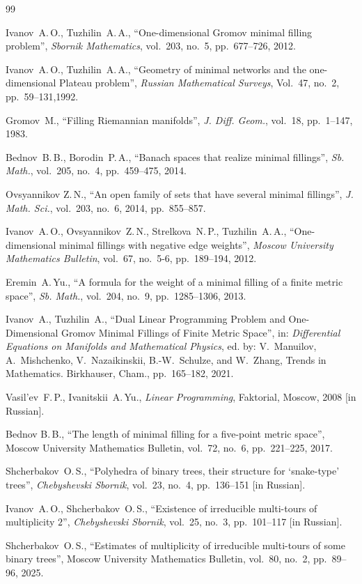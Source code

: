 \documentclass[10pt]{article}
\theoremstyle{plain}
\theoremstyle{definition}
\begin{document}
\begin{thebibliography}{99}

Ivanov~A.\,O., Tuzhilin~A.\,A., ``One-dimensional Gromov minimal filling problem'', \textit{Sbornik Mathematics}, vol.~203, no.~5, pp.~677–726, 2012.

Ivanov~A.\,O., Tuzhilin~A.\,A., ``Geometry of minimal networks and the one-dimensional Plateau problem'', \textit{Russian Mathematical Surveys}, Vol.~47, no.~2, pp.~59--131,1992. 

Gromov~M.,  ``Filling Riemannian manifolds'', \textit{J. Diff. Geom.}, vol.~18,  pp.~1--147, 1983.

Bednov~B.\,B., Borodin~P.\,A., ``Banach spaces that realize minimal fillings'', \textit{Sb. Math.}, vol.~205, no.~4, pp.~459--475, 2014.

Ovsyannikov Z.\,N., ``An open family of sets that have several minimal fillings'', \textit{J. Math. Sci.}, vol.~203, no.~6, 2014, pp.~855--857.

Ivanov~A.\,O., Ovsyannikov~Z.\,N., Strelkova~N.\,P., Tuzhilin~A.\,A., 
``One-dimensional minimal fillings with negative edge weights'', \textit{Moscow University Mathematics Bulletin},  vol.~67, no.~5-6, pp.~189--194, 2012.

Eremin~A.\,Yu., ``A formula for the weight of a minimal filling of a finite metric space'', \textit{Sb. Math.}, vol.~204, no.~9,  pp.~1285–1306, 2013.

 Ivanov~A., Tuzhilin~A., ``Dual Linear Programming Problem and One-Dimensional Gromov Minimal Fillings of Finite Metric Space'',  in: \textit{Differential Equations on Manifolds and Mathematical Physics},  ed. by: 
V.~Manuilov, A.~Mishchenko, V.~Nazaikinskii, B.-W.~Schulze, and W.~Zhang, 
Trends in Mathematics. Birkhauser, Cham.,  pp.~165--182, 2021. 

Vasil'ev~F.\,P.,  Ivanitskii~A.\,Yu., \emph{Linear Programming}, Faktorial, Moscow, 2008 [in Russian].

 Bednov B.\,B., ``The length of minimal filling for a five-point metric space'', Moscow University Mathematics Bulletin, vol.~72, no.~6,  pp.~221--225, 2017.

 Shcherbakov~O.\,S., ``Polyhedra of binary trees, their structure for `snake-type'  trees'', \textit{Chebyshevski Sbornik}, vol.~23, no.~4,  pp.~136--151 [in Russian].

Ivanov~A.\,O., Shcherbakov~O.\,S., ``Existence of irreducible multi-tours of multiplicity $2$'', \textit{Chebyshevski Sbornik}, vol.~25, no.~3,  pp.~101--117 [in Russian].

 Shcherbakov~O.\,S., ``Estimates of multiplicity of irreducible multi-tours of some binary trees'', Moscow University Mathematics Bulletin, vol.~80, no.~2, pp.~89--96, 2025.

\end{thebibliography}
\end{document}

